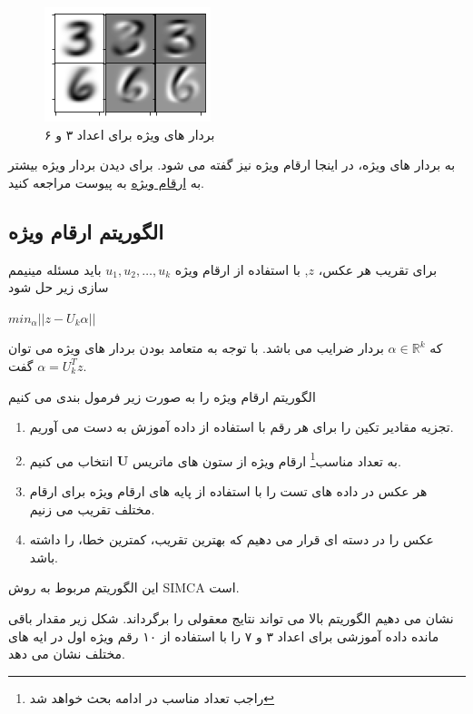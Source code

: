 	\begin{figure}[h]
		\centering
		\includegraphics[width=0.3\linewidth]{assets/bases_3_6.png}
		\caption{بردار های ویژه برای اعداد ۳ و ۶}
	\end{figure}
	
	به بردار های ویژه، در اینجا ارقام ویژه نیز گفته می شود. برای دیدن بردار ویژه بیشتر به \hyperref[sec:eigen_digits]{ارقام ویژه} به پیوست مراجعه کنید. 
	
	 \subsection{الگوریتم ارقام ویژه}
برای تقریب هر عکس، $ z $, با استفاده از ارقام ویژه $ u_1, u_2, \ldots, u_k $ باید مسئله مینیمم سازی زیر حل شود
\begin{center} 
	$ min_{\alpha} \vert\vert z - U_k\alpha \vert\vert $ 
\end{center}
که $ \alpha \in \mathbb{R}^k $ بردار ضرایب می باشد. با توجه به متعامد بودن بردار های ویژه می توان گفت $\alpha = U_k^Tz $.

الگوریتم ارقام ویژه را به صورت زیر فرمول بندی می کنیم 
\begin{enumerate}
	\item
	تجزیه مقادیر تکین را برای هر رقم با استفاده از داده آموزش به دست می آوریم. 
	\item 
	به تعداد مناسب\footnote{راجب تعداد مناسب در ادامه بحث خواهد شد}  ارقام ویژه از ستون های ماتریس $ \mathbf{U} $  انتخاب می کنیم. 
	\item 
	هر عکس در داده های تست را با استفاده از پایه های ارقام ویژه برای ارقام مختلف تقریب می زنیم. 
	\item
	عکس را در دسته ای قرار می دهیم که بهترین تقریب، کمترین خطا، را داشته باشد.
\end{enumerate}
	این الگوریتم مربوط به روش SIMCA \cite{simca} است.
	\pagebreak

		نشان می دهیم الگوریتم بالا می تواند نتایج معقولی را برگرداند. شکل زیر مقدار باقی مانده داده آموزشی برای اعداد ۳ و ۷ را با استفاده از ۱۰ رقم ویژه اول در ایه های مختلف نشان می دهد. \\[5pt]
 
